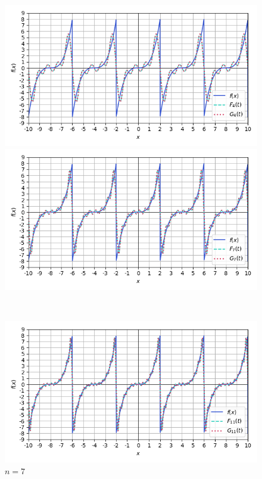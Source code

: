 \documentclass[a4paper]{article}
\begin{document}
\begin{figure}[H]
    \begin{minipage}{0.5\textwidth}
        \centering \includegraphics[width=\textwidth]{odd_func/4.png}
        \caption{$n = 4$}
    \end{minipage}\hfill
    \begin{minipage}{0.5\textwidth}
        \centering \includegraphics[width=\textwidth]{odd_func/7.png}
        \caption{$n = 7$}
    \end{minipage}\\[2em]
    \begin{minipage}{0.5\textwidth}
        \centering \includegraphics[width=\textwidth]{odd_func/11.png}

\end{minipage}
\end{figure}
\end{document}

